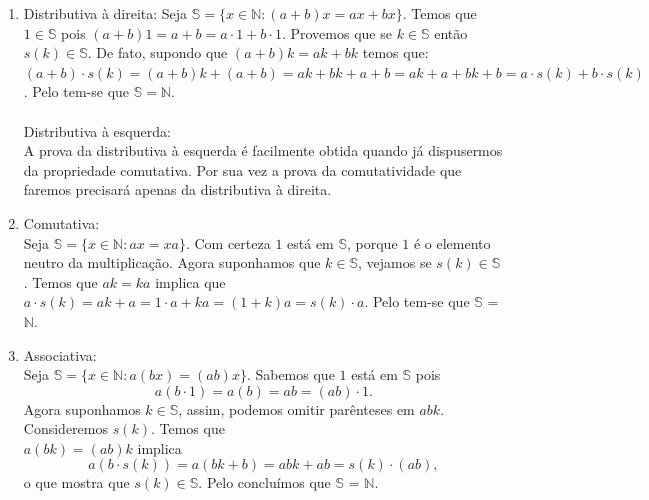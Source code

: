 \documentclass[../main.tex]{subfiles}
\begin{document}
\begin{dem}
\begin{enumerate}[label=(\roman*)]
        \item Distributiva à direita: 
            Seja $\mathbb{S} = \{ x \in \mathbb{N} : ( a + b ) x = ax + bx \}$. Temos que $1 \in \mathbb{S}$ pois $( a + b ) 1 = a + b = a \cdot 1 + b \cdot 1$. Provemos que se $k \in \mathbb{S}$ então $s(k) \in \mathbb{S}$. De fato, supondo que $(a+b)k = ak+bk$ temos que: \\
            $( a + b ) \cdot s(k)= ( a + b ) k + ( a + b ) = ak + bk + a + b = ak + a + bk + b 
            = a \cdot s(k) + b \cdot s(k)$. Pelo  tem-se que $\mathbb{S} = \mathbb{N}$.
            \\ \\
            Distributiva à esquerda: \\
            A prova da distributiva à esquerda é facilmente obtida quando já dispusermos da propriedade comutativa. Por sua vez a prova da comutatividade que faremos precisará apenas da distributiva à direita.
        \item Comutativa: \\
            Seja $\mathbb{S} = \{ x \in \mathbb{N} : ax = xa \}$. Com certeza $1$ está em $\mathbb{S}$, porque $1$ é o elemento neutro da multiplicação. Agora suponhamos que $k \in \mathbb{S}$, vejamos se $s(k) \in \mathbb{S}$. Temos que $ak = ka$ implica que $a \cdot s(k) = ak + a = 1 \cdot a + ka = (1+k)a = s(k) \cdot a$. Pelo  tem-se que $\mathbb{S}$ = $\mathbb{N}$.

        \item Associativa:  \\
            Seja $\mathbb{S} = \{ x \in \mathbb{N} : a(bx) = (ab)x \}$. Sabemos que $1$ está em $\mathbb{S}$ pois 
            \[a (b \cdot 1) = a(b) = ab = (ab)\cdot 1.\]
            Agora suponhamos $k \in \mathbb{S}$, assim, podemos omitir parênteses em $abk$. Consideremos $s(k)$. Temos que \\ $a(bk) = (ab)k$ implica 
            \[ a(b \cdot s(k)) = a(bk + b) = abk + ab = s(k) \cdot  (ab), \] 
            o que mostra que $s(k) \in \mathbb{S}$. Pelo  concluímos que $\mathbb{S}$ = $\mathbb{N}$. 
            

\end{enumerate}
\end{dem}
\end{document}
